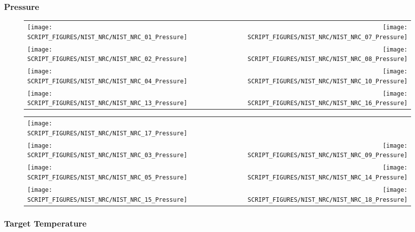 \clearpage

\subsubsection{Pressure}

\begin{figure}[!ht]
\begin{tabular*}{\textwidth}{l@{\extracolsep{\fill}}r}
\texttt{[image: SCRIPT\_FIGURES/NIST\_NRC/NIST\_NRC\_01\_Pressure]} &
\texttt{[image: SCRIPT\_FIGURES/NIST\_NRC/NIST\_NRC\_07\_Pressure]} \\
\texttt{[image: SCRIPT\_FIGURES/NIST\_NRC/NIST\_NRC\_02\_Pressure]} &
\texttt{[image: SCRIPT\_FIGURES/NIST\_NRC/NIST\_NRC\_08\_Pressure]} \\
\texttt{[image: SCRIPT\_FIGURES/NIST\_NRC/NIST\_NRC\_04\_Pressure]} &
\texttt{[image: SCRIPT\_FIGURES/NIST\_NRC/NIST\_NRC\_10\_Pressure]} \\
\texttt{[image: SCRIPT\_FIGURES/NIST\_NRC/NIST\_NRC\_13\_Pressure]} &
\texttt{[image: SCRIPT\_FIGURES/NIST\_NRC/NIST\_NRC\_16\_Pressure]}
\end{tabular*}
\label{NIST_NRC_Pressure_Closed}
\end{figure}

\begin{figure}[!ht]
\begin{tabular*}{\textwidth}{l@{\extracolsep{\fill}}r}
\texttt{[image: SCRIPT\_FIGURES/NIST\_NRC/NIST\_NRC\_17\_Pressure]} &
   \\
\texttt{[image: SCRIPT\_FIGURES/NIST\_NRC/NIST\_NRC\_03\_Pressure]} &
\texttt{[image: SCRIPT\_FIGURES/NIST\_NRC/NIST\_NRC\_09\_Pressure]} \\
\texttt{[image: SCRIPT\_FIGURES/NIST\_NRC/NIST\_NRC\_05\_Pressure]} &
\texttt{[image: SCRIPT\_FIGURES/NIST\_NRC/NIST\_NRC\_14\_Pressure]} \\
\texttt{[image: SCRIPT\_FIGURES/NIST\_NRC/NIST\_NRC\_15\_Pressure]} &
\texttt{[image: SCRIPT\_FIGURES/NIST\_NRC/NIST\_NRC\_18\_Pressure]}
\end{tabular*}
\label{NIST_NRC_Pressure_Open}
\end{figure}

\clearpage

\subsubsection{Target Temperature}

